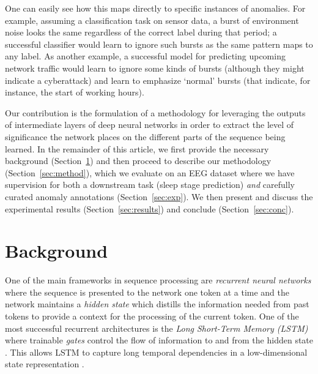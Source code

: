 \documentclass[runningheads]{llncs}
\begin{document}
One can easily see how this maps directly to specific instances of
anomalies. For example, assuming a classification task on sensor data,
a burst of environment noise looks the same regardless of the correct
label during that period; a successful classifier would learn to
ignore such bursts as the same pattern maps to any label. As another
example, a successful model for predicting upcoming network traffic
would learn to ignore some kinds of bursts (although they might
indicate a cyberattack) and learn to emphasize `normal' bursts
(that indicate, for instance, the start of working hours).

Our contribution is the formulation of a methodology for leveraging
the outputs of intermediate layers of deep neural networks in order
to extract the level of significance the network places on the
different parts of the sequence being learned. In the remainder of
this article, we first provide the necessary background
(Section~\ref{sec:bg}) and then proceed to describe our
methodology (Section~\ref{sec:method}), which we evaluate on
an EEG dataset where we have supervision for both a downstream task
(sleep stage prediction) \emph{and} carefully curated anomaly
annotations (Section~\ref{sec:exp}). We then present and discuss
the experimental results (Section~\ref{sec:results}) and conclude
(Section~\ref{sec:conc}).



\section{Background}
\label{sec:bg}


One of the main frameworks in sequence processing are
\emph{recurrent neural networks} where the sequence is presented to
the network one token at a time and the network maintains a
\emph{hidden state} which distills the information needed from past
tokens to provide a context for the processing of the current token.
One of the most successful recurrent architectures is the
\emph{Long Short-Term Memory (LSTM)} where trainable \emph{gates}
control the flow of information to and from the hidden state
\cite{hochreiter-schmidhuber:1997}. This allows LSTM to capture long
temporal dependencies in a low-dimensional state representation
\cite{HOJJATI2024106106,10744017}.
\end{document}
